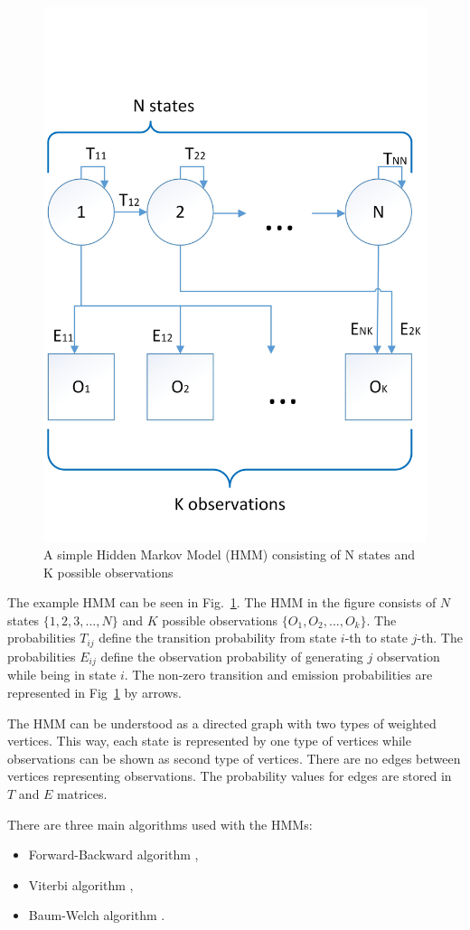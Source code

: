 \begin{figure}[htbp!]
\centering
 \includegraphics[width=0.7\columnwidth]{figures/HMM1.jpg}
 \caption[]{A simple Hidden Markov Model (HMM) consisting of N states and K possible observations}
 \label{dynamicgestureswiki}
\end{figure}


The example HMM can be seen in Fig.~\ref{dynamicgestureswiki}.
The HMM in the figure consists of $N$ states $\{1, 2, 3, ..., N\}$ and $K$ possible observations $\{O_1, O_2, ..., O_k\}$.
The probabilities $T_{ij}$ define the transition probability from state $i$-th to state $j$-th. 
The probabilities $E_{ij}$ define the observation probability of generating $j$ observation while being in state $i$.
The non-zero transition and emission probabilities are represented in Fig~\ref{dynamicgestureswiki} by arrows.

The HMM can be understood as a directed graph with two types of weighted vertices. 
This way, each state is represented by one type of vertices while observations can be shown as second type of vertices.
There are no edges between vertices representing observations.
The probability values for edges are stored in $T$ and $E$ matrices.

There are three main algorithms used with the HMMs:
\begin{itemize}
\item Forward-Backward algorithm \cite{hmmtutorial, hmm}, 
\item Viterbi algorithm \cite{hmmtutorial, hmm},
\item Baum-Welch algorithm \cite{hmmtutorial, hmm}.
\end{itemize}

